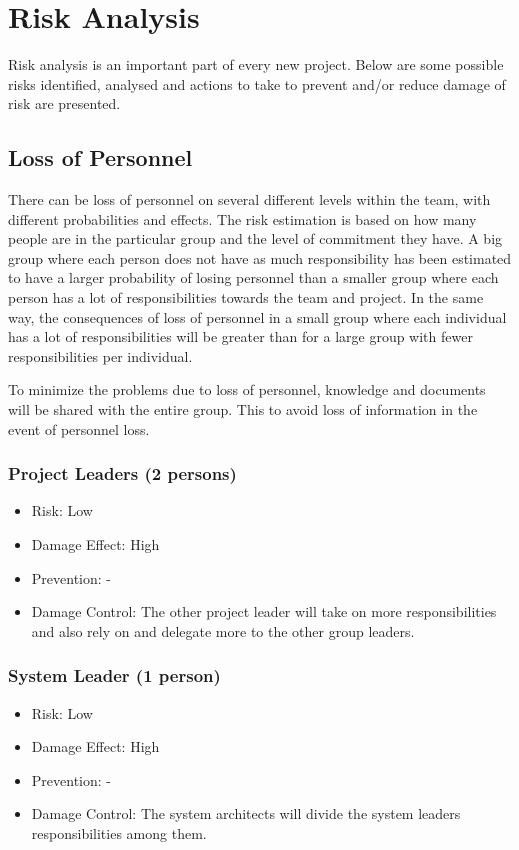 \documentclass[a4paper]{article}
\begin{document}
\section{Risk Analysis}

Risk analysis is an important part of every new project. Below are some possible risks identified, analysed and actions to take to prevent and/or reduce damage of risk are presented.  

\subsection{Loss of Personnel}
There can be loss of personnel on several different levels within the team, with different probabilities and effects. The risk estimation is based on how many people are in the particular group and the level of commitment they have. A big group where each person does not have as much responsibility has been estimated to have a larger probability of losing personnel than a smaller group where each person has a lot of responsibilities towards the team and project. In the same way, the consequences of loss of personnel in a small group where each individual has a lot of responsibilities will be greater than for a large group with fewer responsibilities per individual.

To minimize the problems due to loss of personnel, knowledge and documents will be shared with the entire group. This to avoid loss of information in the event of personnel loss.

\subsubsection{Project Leaders (2 persons)}
\begin{itemize}
\item Risk: Low
\item Damage Effect: High
\item Prevention: -
\item Damage Control: The other project leader will take on more responsibilities and also rely on and delegate more to the other group leaders.
\end{itemize}

\subsubsection{System Leader (1 person)}
\begin{itemize}
\item Risk: Low
\item Damage Effect: High
\item Prevention: -
\item Damage Control: The system architects will divide the system leaders responsibilities among them.
\end{itemize}
\end{document}

